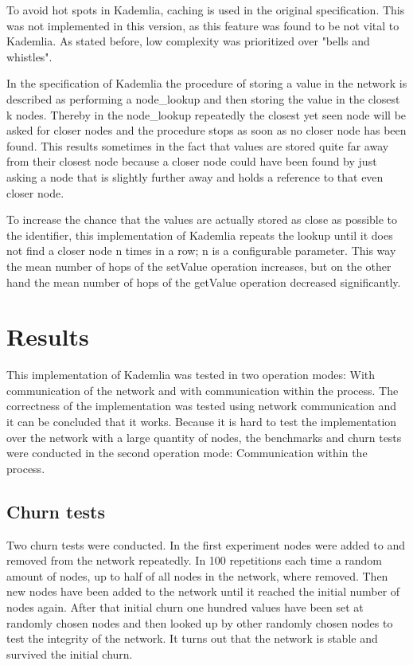 \documentclass[a4paper, 12pt]{article} %
\begin{document}
To avoid hot spots in Kademlia, caching is used in the original specification. This was not implemented in this version, as this feature was found to be not vital to Kademlia. As stated before, low complexity was prioritized over "bells and whistles".

In the specification of Kademlia the procedure of storing a value in the network is described as performing a node\_lookup and then storing the value in the closest k nodes. Thereby in the node\_lookup repeatedly the closest yet seen node will be asked for closer nodes and the procedure stops as soon as no closer node has been found. This results sometimes in the fact that values are stored quite far away from their closest node because a closer node could have been found by just asking a node that is slightly further away and holds a reference to that even closer node. 

To increase the chance that the values are actually stored as close as possible to the identifier, this implementation of Kademlia repeats the lookup until it does not find a closer node n times in a row; n is a configurable parameter. This way the mean number of hops of the setValue operation increases, but on the other hand the mean number of hops of the getValue operation decreased significantly. %

\newpage
\section{Results}

This implementation of Kademlia was tested in two operation modes: With communication of the network and with communication within the process. The correctness of the implementation was tested using network communication and it can be concluded that it works. Because it is hard to test the implementation over the network with a large quantity of nodes, the benchmarks and churn tests were conducted in the second operation mode: Communication within the process.

\subsection{Churn tests}

Two churn tests were conducted. In the first experiment nodes were added to and removed from the network repeatedly. In 100 repetitions each time a random amount of nodes, up to half of all nodes in the network, where removed. Then new nodes have been added to the network until it reached the initial number of nodes again.  After that initial churn one hundred values have been set at randomly chosen nodes and then looked up by other randomly chosen nodes to test the integrity of the network. It turns out that the network is stable and survived the initial churn.
\end{document}
